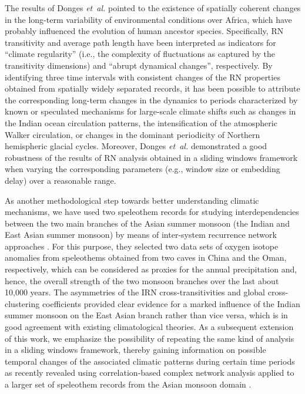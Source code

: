 		The results of Donges \textit{et~al.} \cite{Donges2011a} pointed to the existence of spatially coherent changes in the long-term variability of environmental conditions over Africa, which have probably influenced the evolution of human ancestor species. Specifically, RN transitivity and average path length have been interpreted as indicators for ``climate regularity'' (i.e., the complexity of fluctuations as captured by the transitivity dimensions) and ``abrupt dynamical changes'', respectively. By identifying three time intervals with consistent changes of the RN properties obtained from spatially widely separated records, it has been possible to attribute the corresponding long-term changes in the dynamics to periods characterized by known or speculated mechanisms for large-scale climate shifts such as changes in the Indian ocean circulation patterns, the intensification of the atmospheric Walker circulation, or changes in the dominant periodicity of Northern hemispheric glacial cycles. Moreover, Donges \textit{et~al.} \cite{Donges2011} demonstrated a good robustness of the results of RN analysis obtained in a sliding windows framework when varying the corresponding parameters (e.g., window size or embedding delay) over a reasonable range.

		As another methodological step towards better understanding climatic mechanisms, we have used two speleothem records for studying interdependencies between the two main branches of the Asian summer monsoon (the Indian and East Asian summer monsoon) by means of inter-system recurrence network approaches \cite{Feldhoff2012}. For this purpose, they selected two data sets of oxygen isotope anomalies from speleothems obtained from two caves in China and the Oman, respectively, which can be considered as proxies for the annual precipitation and, hence, the overall strength of the two monsoon branches over the last about 10,000 years. The asymmetries of the IRN cross-transitivities and global cross-clustering coefficients provided clear evidence for a marked influence of the Indian summer monsoon on the East Asian branch rather than vice versa, which is in good agreement with existing climatological theories. As a subsequent extension of this work, we emphasize the possibility of repeating the same kind of analysis in a sliding windows framework, thereby gaining information on possible temporal changes of the associated climatic patterns during certain time periods as recently revealed using correlation-based complex network analysis applied to a larger set of speleothem records from the Asian monsoon domain \cite{Rehfeld2012}.

